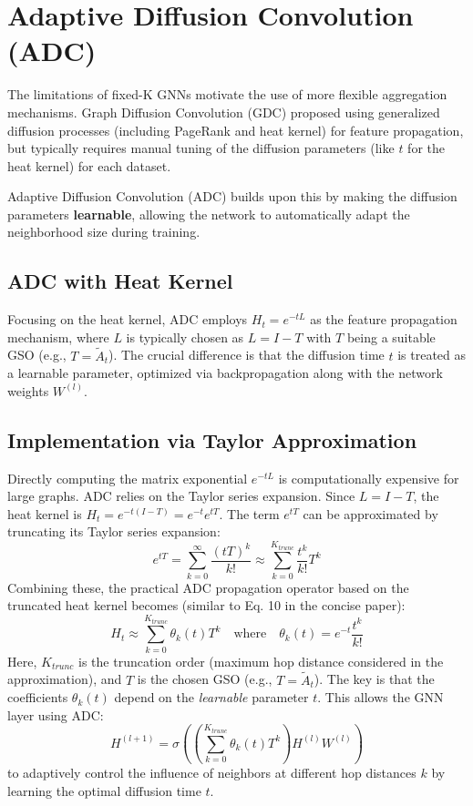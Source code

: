 \section{Adaptive Diffusion Convolution (ADC)}
\label{sec:adc}

The limitations of fixed-K GNNs motivate the use of more flexible aggregation mechanisms. Graph Diffusion Convolution (GDC) \cite{Klicpera2019DiffusionGCN} proposed using generalized diffusion processes (including PageRank and heat kernel) for feature propagation, but typically requires manual tuning of the diffusion parameters (like $t$ for the heat kernel) for each dataset.

Adaptive Diffusion Convolution (ADC) \cite{Zhao2021ADC} builds upon this by making the diffusion parameters \textbf{learnable}, allowing the network to automatically adapt the neighborhood size during training.

\subsection{ADC with Heat Kernel}
Focusing on the heat kernel, ADC employs $H_t = e^{-tL}$ as the feature propagation mechanism, where $L$ is typically chosen as $L = I - T$ with $T$ being a suitable GSO (e.g., $T=\tilde{A}_t$). The crucial difference is that the diffusion time $t$ is treated as a learnable parameter, optimized via backpropagation along with the network weights $W^{(l)}$.

\subsection{Implementation via Taylor Approximation}
Directly computing the matrix exponential $e^{-tL}$ is computationally expensive for large graphs. ADC relies on the Taylor series expansion. Since $L = I - T$, the heat kernel is $H_t = e^{-t(I-T)} = e^{-t} e^{tT}$. The term $e^{tT}$ can be approximated by truncating its Taylor series expansion:
\begin{equation}
    e^{tT} = \sum_{k=0}^{\infty} \frac{(tT)^k}{k!} \approx \sum_{k=0}^{K_{trunc}} \frac{t^k}{k!} T^k
\end{equation}
Combining these, the practical ADC propagation operator based on the truncated heat kernel becomes (similar to Eq. 10 in the concise paper):
\begin{equation}
    H_t \approx \sum_{k=0}^{K_{trunc}} \theta_k(t) T^k \quad \text{where} \quad \theta_k(t) = e^{-t} \frac{t^k}{k!}
    \label{eq:adc_approx_original} %
\end{equation}
Here, $K_{trunc}$ is the truncation order (maximum hop distance considered in the approximation), and $T$ is the chosen GSO (e.g., $T = \tilde{A}_t$). The key is that the coefficients $\theta_k(t)$ depend on the \textit{learnable} parameter $t$. This allows the GNN layer using ADC:
\begin{equation}
    H^{(l+1)} = \sigma \left( \left( \sum_{k=0}^{K_{trunc}} \theta_k(t) T^k \right) H^{(l)} W^{(l)} \right)
\end{equation}
to adaptively control the influence of neighbors at different hop distances $k$ by learning the optimal diffusion time $t$.


